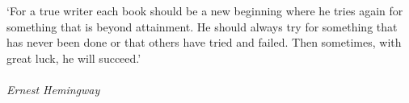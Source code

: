 \clearpage

\narrowlinespacing

\vspace*{4mm}
`For a true writer each book should be a new beginning where he tries again for something that is beyond attainment. He should always try for something that has never been done or that others have tried and failed. Then sometimes, with great luck, he will succeed.'\\
\\
\emph{Ernest Hemingway}

\normallinespacing